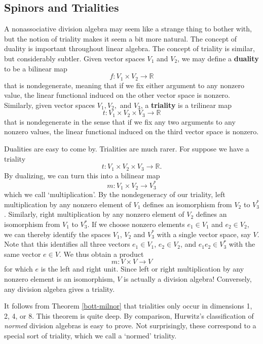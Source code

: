 \documentclass[12pt]{article}
\newcommand\R{{\mathbb R}}
\newcommand{\maps}{\colon}
\begin{document}
\subsection{Spinors and Trialities}  \label{triality}   
   
A nonassociative division algebra may seem like a strange thing to   
bother with, but the notion of triality makes it seem a bit more   
natural.  The concept of duality is important throughout linear algebra.   
The concept of triality is similar, but considerably subtler.  Given   
vector spaces $V_1$ and $V_2$, we may define a {\bf duality} to be a   
bilinear map    
\[    f \maps V_1 \times V_2 \to \R   \]   
that is nondegenerate, meaning that if we fix either argument   
to any nonzero value, the linear functional induced on the other vector   
space is nonzero.  Similarly, given vector spaces $V_1,V_2,$ and $V_3$,   
a {\bf triality} is a trilinear map    
\[    t \maps V_1 \times V_2 \times V_3 \to \R   \]   
that is nondegenerate in the sense that if we fix any two arguments to   
any nonzero values, the linear functional induced on the third vector   
space is nonzero.   
   
Dualities are easy to come by.  Trialities are much rarer.  For suppose   
we have a triality  
\[    t \maps V_1 \times V_2 \times V_3 \to \R  . \]   
By dualizing, we can turn this into a bilinear map   
\[     m \maps V_1 \times V_2 \to V_3^\ast     \]   
which we call `multiplication'.  By the nondegeneracy of our triality,   
left multiplication by any nonzero element of $V_1$ defines an   
isomorphism from $V_2$ to $V_3^\ast$.  Similarly, right multiplication   
by any nonzero element of $V_2$ defines an isomorphism from $V_1$ to   
$V_3^\ast$.  If we choose nonzero elements $e_1 \in V_1$ and $e_2 \in   
V_2$, we can thereby identify the spaces $V_1$, $V_2$ and $V_3^\ast$   
with a single vector space, say $V$.   Note that this identifies   
all three vectors $e_1 \in V_1$, $e_2 \in V_2$, and $e_1e_2 \in V_3^\ast$   
with the same vector $e \in V$.   We thus obtain a product   
\[      m \maps V \times V \to V        \]   
for which $e$ is the left and right unit.  Since left or right   
multiplication by any nonzero element is an isomorphism, $V$ is   
actually a division algebra!   Conversely, any division algebra   
gives a triality.     

It follows from Theorem \ref{bott-milnor}  that trialities only occur in
dimensions 1, 2, 4, or 8.  This theorem is quite deep.  By comparison,
Hurwitz's classification of {\it normed} division algebras is easy to
prove.  Not surprisingly, these correspond to a special sort of
triality, which we call a `normed' triality.  
  
\end{document}
